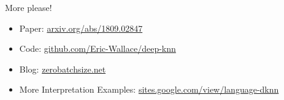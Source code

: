 \documentclass[final]{beamer} %
\begin{document}
\begin{frame}
\begin{columns}
\begin{column}{.5\linewidth}
\begin{block}{More please!}
\small{
\begin{itemize}
	\item{Paper}: \url{arxiv.org/abs/1809.02847}
    \item{Code}: \url{github.com/Eric-Wallace/deep-knn}
    \item{Blog}: \url{zerobatchsize.net}
    \item{More Interpretation Examples}: \url{sites.google.com/view/language-dknn}
\end{itemize}
}
\end{block}

\begin{block}
\scriptsize{


}
\end{block}
\end{column}
\end{columns}
\end{frame}
\end{document}
